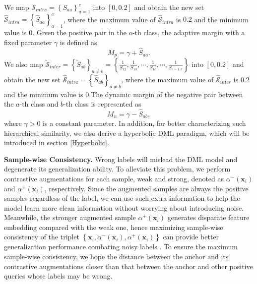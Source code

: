 \documentclass[lettersize,journal]{IEEEtran}
\begin{document}
We map ${\mathcal{S}}_{intra} = \left\lbrace {S}_{aa} \right\rbrace_{a = 1}^c $ into $[0,0.2]$ and obtain the new set  $\hat{\mathcal{S}}_{intra} = \left\lbrace \hat{S}_{aa} \right\rbrace_{a = 1}^c$, where the maximum value of $\hat{\mathcal{S}}_{intra}$ is $0.2$ and the minimum value is $0$.
Given the positive pair in the $a$-th class, the adaptive margin with a fixed parameter $\gamma$ is defined as
\begin{equation}
	M_p = \gamma + \hat{S}_{aa}.
	\label{Mp}
\end{equation}
We also map $\tilde{\mathcal{S}}_{inter} = \left\lbrace \tilde{S}_{ab} \right\rbrace_{a \neq b} = \left\lbrace \frac{1}{S_{12}}, \frac{1}{S_{13}},\cdots,  \frac{1}{S_{1c}},\cdots, \frac{1}{S_{c-1,c}} \right\rbrace $ into $[0,0.2]$ and obtain the new set  $\hat{\mathcal{S}}_{intra} = \left\lbrace \hat{S}_{ab} \right\rbrace_{a\neq b}$, where the maximum value of $\hat{\mathcal{S}}_{inter}$ is $0.2$ and the minimum value is $0$.The dynamic margin of the negative pair between the $a$-th class and $b$-th class is represented as
\begin{equation}
	M_n =  \gamma - \hat{S}_{ab},
	\label{Mn}
\end{equation} 
where $\gamma > 0$ is a constant parameter. In addition, for better characterizing such hierarchical similarity, we also derive a hyperbolic DML paradigm, which will be introduced in section \ref{Hyperbolic}.



\textbf{Sample-wise Consistency.} Wrong labels will  mislead the DML model and degenerate its generalization ability. To alleviate this problem, we perform contrastive augmentations for each sample, weak and strong, denoted as $\alpha^{-}(\mathbf{x}_i)$ and $\alpha^{+}(\mathbf{x}_i)$, respectively. Since the augmented samples are always the positive samples regardless of the label, we can use such extra information to help the model learn more clean information without worrying about introducing noise.   Meanwhile, the stronger augmented sample $\alpha^{+}(\mathbf{x}_i)$ generates disparate
feature embedding compared with the weak one, hence maximizing sample-wise consistency of the triplet $\left\lbrace\mathbf{x}_i,\alpha^{-}(\mathbf{x}_i),\alpha^{+}(\mathbf{x}_i) \right\rbrace $ can provide better generalization performance combating noisy labels \cite{sohn2020fixmatch}. To ensure the maximum sample-wise consistency, we hope the distance between the anchor and its contrastive augmentations closer than that between the anchor and other positive queries whose labels may be wrong. 
\end{document}
